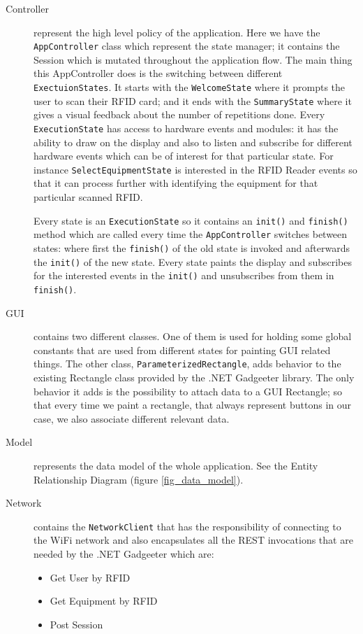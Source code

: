 \documentclass{tk3-team}
\begin{document}
\begin{description}
\item[Controller] represent the high level policy of the application. Here we have the \texttt{AppController} class which represent the state manager; it contains the Session which is mutated throughout the application flow. The main thing this AppController does is the switching between different \texttt{ExectuionStates}. It starts with the \texttt{WelcomeState} where it prompts the user to scan their RFID card; and it ends with the \texttt{SummaryState} where it gives a visual feedback about the number of repetitions done. Every \texttt{ExecutionState} has access to hardware events and modules: it has the ability to draw on the display and also to listen and subscribe for different hardware events which can be of interest for that particular state. For instance \texttt{SelectEquipmentState} is interested in the RFID Reader events so that it can process further with identifying the equipment for that particular scanned RFID. 

Every state is an \texttt{ExecutionState} so it contains an \texttt{init()} and \texttt{finish()} method which are called every time the \texttt{AppController} switches between states: where first the \texttt{finish()} of the old state is invoked and afterwards the \texttt{init()} of the new state. Every state paints the display and subscribes for the interested events in the \texttt{init()} and unsubscribes from them in \texttt{finish()}.

\item[GUI] contains two different classes. One of them is used for holding some global constants that are used from different states for painting GUI related things. The other class, \texttt{ParameterizedRectangle}, adds behavior to the existing Rectangle class provided by the .NET Gadgeeter library. The only behavior it adds is the possibility to attach data to a GUI Rectangle; so that every time we paint a rectangle, that always represent buttons in our case, we also associate different relevant data.

\item[Model] represents the data model of the whole application. See the Entity Relationship Diagram (figure \ref{fig_data_model}).

\item[Network] contains the \texttt{NetworkClient} that has the responsibility of connecting to the WiFi network and also encapsulates all the REST invocations that are needed by the .NET Gadgeeter which are: 
\begin{itemize}
	\item Get User by RFID
	\item Get Equipment by RFID 
	\item Post Session
\end{itemize}


\end{description}
\end{document}
